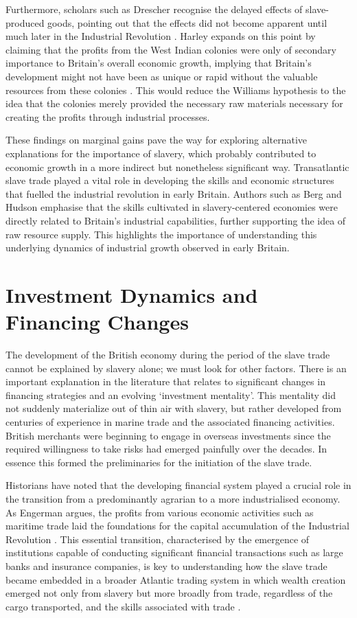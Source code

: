 \documentclass[a4paper,11pt]{article}
\begin{document}
Furthermore, scholars such as Drescher recognise the delayed effects of slave-produced goods, pointing out that the effects did not become apparent until much later in the Industrial Revolution \citep{drescher1997}. Harley expands on this point by claiming that the profits from the West Indian colonies were only of secondary importance to Britain's overall economic growth, implying that Britain's development might not have been as unique or rapid without the valuable resources from these colonies \citep{harley2015}. This would reduce the Williams hypothesis to the idea that the colonies merely provided the necessary raw materials necessary for creating the profits through industrial processes.

These findings on marginal gains pave the way for exploring alternative explanations for the importance of slavery, which probably contributed to economic growth in a more indirect but nonetheless significant way. Transatlantic slave trade played a vital role in developing the skills and economic structures that fuelled the industrial revolution in early Britain. Authors such as Berg and Hudson emphasise that the skills cultivated in slavery-centered economies were directly related to Britain's industrial capabilities, further supporting the idea of raw resource supply. This highlights the importance of understanding this underlying dynamics of industrial growth  observed in early Britain\citep{berghudson2021}.

\section{Investment Dynamics and Financing Changes}

The development of the British economy during the period of the slave trade cannot be explained by slavery alone; we must look for other factors. There is an important explanation in the literature that relates to significant changes in financing strategies and an evolving ‘investment mentality’. This mentality did not suddenly materialize out of thin air with slavery, but rather developed from centuries of experience in marine trade and the associated financing activities. British merchants were beginning to engage in overseas investments since the required willingness to take risks had emerged painfully over the decades. In essence this formed the preliminaries for the initiation of the slave trade.

Historians have noted that the developing financial system played a crucial role in the transition from a predominantly agrarian to a more industrialised economy. As Engerman argues, the profits from various economic activities such as maritime trade laid the foundations for the capital accumulation of the Industrial Revolution \citep{eltisengerman2000}. This essential transition, characterised by the emergence of institutions capable of conducting significant financial transactions such as large banks and insurance companies, is key to understanding how the slave trade became embedded in a broader Atlantic trading system in which wealth creation emerged not only from slavery but more broadly from trade, regardless of the cargo transported, and the skills associated with trade \citep{solow1985}.
\end{document}
